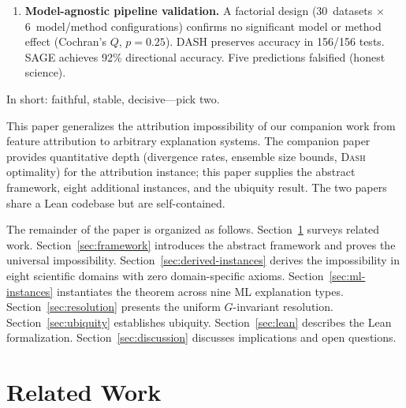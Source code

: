 \documentclass[11pt,a4paper]{article}
\newcommand{\DASH}{\textsc{Dash}}
\begin{document}
\begin{enumerate}[label=(\arabic*)]
    Chouldechova--Kleinberg fairness impossibility transitions from
    full tightness (all pairs achievable by degenerate classifiers) to
    PPV-blocked (calibration as universal poison) under operational
    performance constraints (TPR~$\geq 0.3$).  Equalized odds is the
    only achievable pairwise compromise at practical performance.
    Validated on Adult Income and synthetic data.
  \item \textbf{Model-agnostic pipeline validation.}  A factorial
    design (30~datasets $\times$ 6~model/method configurations) confirms
    no significant model or method effect (Cochran's $Q$, $p = 0.25$).
    DASH preserves accuracy in 156/156 tests.  SAGE achieves 92\%
    directional accuracy.  Five predictions falsified (honest science).
\end{enumerate}

\noindent In short: faithful, stable, decisive---pick two.

This paper generalizes the attribution impossibility of our companion work
\citep{bilodeau2024impossibility} from feature attribution to arbitrary
explanation systems.  The companion paper provides quantitative depth
(divergence rates, ensemble size bounds, \DASH{} optimality) for the
attribution instance; this paper supplies the abstract framework, eight
additional instances, and the ubiquity result.  The two papers share a
Lean codebase but are self-contained.

The remainder of the paper is organized as follows.
Section~\ref{sec:related} surveys related work.
Section~\ref{sec:framework} introduces the abstract framework and proves
the universal impossibility.
Section~\ref{sec:derived-instances} derives the impossibility in eight
scientific domains with zero domain-specific axioms.
Section~\ref{sec:ml-instances} instantiates the
theorem across nine ML explanation types.
Section~\ref{sec:resolution} presents the
uniform $G$-invariant resolution.  Section~\ref{sec:ubiquity} establishes
ubiquity.  Section~\ref{sec:lean} describes the Lean formalization.
Section~\ref{sec:discussion} discusses implications and open questions.

\section{Related Work}
\label{sec:related}
\end{document}
